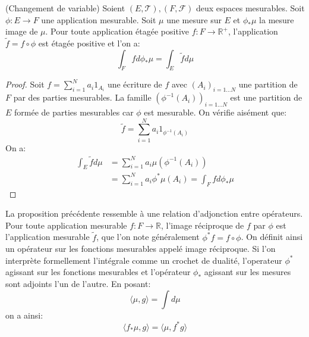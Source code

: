 \begin{mandatory}
\begin{prop}{(Changement de variable)}
Soient $(E, \mathcal{T}), (F, \mathcal{F})$ deux espaces mesurables. Soit $\phi
\colon E \to F$ une application mesurable. Soit $\mu$ une mesure sur $E$ et
$\phi_*\mu$ la mesure image de $\mu$. Pour toute application étagée positive $f
\colon F \to \mathbb{R}^+$, l'application $\tilde{f} = f \circ \phi$ est étagée
positive et l'on a:
\[
\int_F f d\phi_*\mu = \int_E \tilde{f} d \mu
\]
\end{prop}
\end{mandatory}
\begin{proof}
Soit $f = \sum_{i=1}^N a_i 1_{A_i}$ une écriture de $f$ avec $(A_i)_{i=1\dots
N}$ une partition de $F$ par des parties mesurables. La famille
$\left(\phi^{-1}(A_i)\right)_{i=1\dots N}$ est une partition de $E$ formée de
parties mesurables car $\phi$ est mesurable. On vérifie aisément que:
\[
\tilde{f} = \sum_{i=1}^N a_i 1_{\phi^{-1}(A_i)}
\] 
On a:
\begin{align*}
\int_E \tilde{f} d\mu & = \sum_{i=1}^N a_i \mu\left(\phi^{-1}(A_i)\right) \\
& = \sum_{i=1}^N a_i \phi^*\mu\left(A_i\right) = \int_F f d\phi_*\mu
\end{align*} 
\end{proof}
La proposition précédente ressemble à une relation d'adjonction entre
opérateurs. Pour toute application mesurable $f \colon F \to \mathbb{R}$, 
l'image réciproque de $f$ par $\phi$ est l'application mesurable $\tilde{f}$, 
que l'on note généralement $\phi^*f = f \circ \phi$. On définit ainsi un
opérateur sur les fonctions mesurables appelé image réciproque. Si l'on
interprète formellement l'intégrale comme un crochet de dualité, 
l'operateur $\phi^*$ agissant sur les fonctions mesurables et l'opérateur
$\phi_*$ agissant sur les mesures sont adjoints l'un de l'autre.
En posant:
\[
\langle \mu, g \rangle = \int d \mu
\]
on a ainsi:
\[
\langle f_*\mu, g \rangle = \langle \mu, f^*g \rangle
\]

